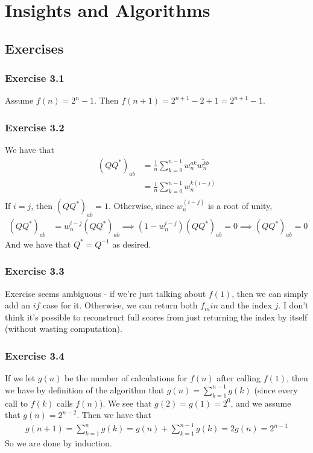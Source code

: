 \section{Insights and Algorithms}

\subsection{Exercises}

\subsubsection{Exercise 3.1}
Assume $f(n) = 2^{n} - 1$. Then $f(n + 1) = 2^{n + 1} - 2 + 1 = 2^{n + 1} - 1$.

\subsubsection{Exercise 3.2}
We have that
\begin{align*}
        (QQ^* )_{ab} &= \frac{1}{n}\sum_{k = 0}^{n - 1} w_n^{ak} \bar{w_n^{kb}} \\
                     &= \frac{1}{n}\sum_{k = 0}^{n - 1} w_n^{k(i - j)}\\
\end{align*}
If $i = j$, then $(QQ^*)_{ab} = 1$. Otherwise, since $w_n^{(i - j)}$ is a root of unity,
\begin{align*}
        (QQ^*)_{ab} &= w_n^{i - j} (QQ^*)_{ab} \implies (1 - w_n^{i - j}) (QQ^*)_{ab} = 0 \implies
        (QQ^*)_{ab} = 0
\end{align*}
And we have that $Q^* = Q^{-1}$ as desired.

\subsubsection{Exercise 3.3}
Exercise seems ambiguous - if we're just talking about $f(1)$, then we can simply add an $if$ case for it.
Otherwise, we can return both $f_min$ and the index $j$. I don't think it's possible to 
reconstruct full scores from just returning the index by itself (without wasting computation).

\subsubsection{Exercise 3.4}
If we let $g(n)$ be the number of calculations for $f(n)$ after calling $f(1)$, then we have by definition
of the algorithm that $g(n) = \sum_{k = 1}^{n - 1} g(k)$ (since every call to $f(k)$ calls $f(n)$).
We see that $g(2) = g(1) = 2^0$, and we assume that $g(n) = 2^{n - 2}$. Then we have that
\begin{align*}
        g(n + 1) = \sum_{k = 1}^{n} g(k) = g(n) + \sum_{k = 1}^{n - 1} g(k) = 2g(n) = 2^{n - 1}
\end{align*}
So we are done by induction.

